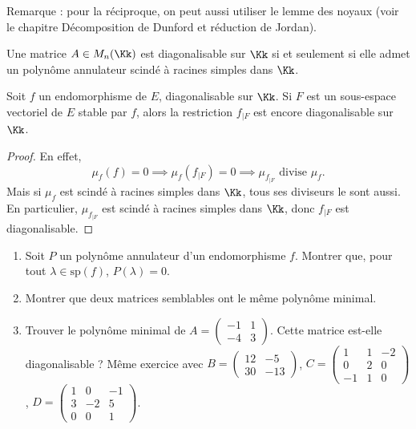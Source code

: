 \documentclass[12pt, class=report,crop=false]{standalone}
\newcommand{\Sp}{\text{sp}}
\begin{document}
Remarque : pour la réciproque, on peut aussi utiliser le lemme des noyaux (voir le chapitre \og{}Décomposition de Dunford et réduction de Jordan\fg{}). 

\medskip

\begin{corollaire}
Une matrice $A \in M_n(\Kk)$ est diagonalisable sur $\Kk$ si et seulement si elle admet un polynôme annulateur scindé à racines simples dans $\Kk$.
\end{corollaire}

\begin{corollaire}
Soit $f$ un endomorphisme de $E$, diagonalisable sur $\Kk$. Si $F$ est un sous-espace vectoriel de $E$ stable par $f$, alors la restriction $f_{|F}$ est encore diagonalisable sur $\Kk$.
\end{corollaire}

\begin{proof}
En effet, 
\[\mu_f(f) = 0 \implies \mu_f(f_{|F}) = 0 \implies \mu_{f_{|F}} \text{ divise } \mu_f.\]
Mais si $\mu_f$ est scindé à racines simples dans $\Kk$, 
tous ses diviseurs le sont aussi. En particulier, $\mu_{f_{|F}}$ est scindé à racines simples dans $\Kk$, donc $f_{|F}$ est diagonalisable.
\end{proof}






\begin{miniexercices}
\sauteligne
\begin{enumerate}

  \item Soit $P$ un polynôme annulateur d'un endomorphisme $f$. Montrer que, pour tout 
  $\lambda \in \Sp(f)$, $P(\lambda) = 0$.
  
  \item Montrer que deux matrices semblables ont le même polynôme minimal.
 
  \item Trouver le polynôme minimal de 
  $A = \left(\begin{smallmatrix}
  -1 & 1 \\
  -4 & 3  
  \end{smallmatrix}\right)$. 
  Cette matrice est-elle diagonalisable ?
  Même exercice avec 
  $B = \left(\begin{smallmatrix} 
  12 & -5 \\
  30 & -13
  \end{smallmatrix}\right)$, 
  $C = \left(\begin{smallmatrix}  
  1 & 1 & -2 \\
  0 & 2 & 0 \\
  -1 & 1 & 0
  \end{smallmatrix}\right)$,
  $D = \left(\begin{smallmatrix} 
  1 & 0 & -1 \\
  3 & -2 & 5 \\
  0 & 0 & 1 
  \end{smallmatrix}\right)$.   
    
\end{enumerate}
\end{miniexercices}






\finchapitre 
\end{document}
